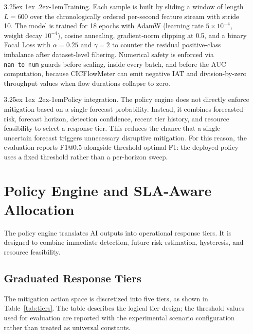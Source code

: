 \documentclass[12pt, a4paper, reqno, oneside]{book}
\makeatletter
\renewcommand\paragraph{\@startsection{paragraph}{5}{\z@}%
  {3.25ex \@plus1ex \@minus.2ex}{-1em}{\normalfont\normalsize\bfseries}}
\makeatother
\begin{document}
\paragraph{Training.}
Each sample is built by sliding a window of length $L=600$ over the
chronologically ordered per-second feature stream with stride 10. The model
is trained for 18 epochs with AdamW (learning rate $5\!\times\!10^{-4}$, weight
decay $10^{-4}$), cosine annealing, gradient-norm clipping at 0.5, and a
binary Focal Loss \cite{lin2017focal} with $\alpha=0.25$ and $\gamma=2$ to
counter the residual positive-class imbalance after dataset-level filtering.
Numerical safety is enforced via \texttt{nan\_to\_num} guards before scaling,
inside every batch, and before the AUC computation, because CICFlowMeter can
emit negative IAT and division-by-zero throughput values when flow durations
collapse to zero.

\paragraph{Policy integration.}
The policy engine does not directly enforce mitigation based on a single
forecast probability. Instead, it combines forecasted risk, forecast horizon,
detection confidence, recent tier history, and resource feasibility to select
a response tier. This reduces the chance that a single uncertain forecast
triggers unnecessary disruptive mitigation. For this reason, the evaluation
reports F1@$0.5$ alongside threshold-optimal F1: the deployed policy uses a
fixed threshold rather than a per-horizon sweep.

\section{Policy Engine and SLA-Aware Allocation}
\label{sec:policy-sla}

The policy engine translates AI outputs into operational response tiers. It is
designed to combine immediate detection, future risk estimation, hysteresis,
and resource feasibility.

\subsection{Graduated Response Tiers}
\label{subsec:tiers}

The mitigation action space is discretized into five tiers, as shown in
Table~\ref{tab:tiers}. The table describes the logical tier design; the
threshold values used for evaluation are reported with the experimental
scenario configuration rather than treated as universal constants.
\end{document}
